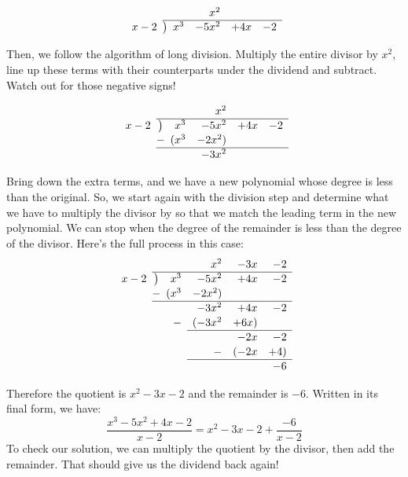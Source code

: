 \[
\renewcommand\arraystretch{1.1}
\begin{array}{*1r @{\hskip\arraycolsep}c@{\hskip\arraycolsep} *4r}
		&	~	&&x^2&\\
\cline{2-6}
x-2		&\big)	&x^3&-5x^2&+4x&-2\\
\end{array}
\]


Then, we follow the algorithm of long division. Multiply the entire divisor by $x^2$, line up these terms with their counterparts under the dividend and subtract. Watch out for those negative signs!

\[
\renewcommand\arraystretch{1.1}
\begin{array}{*1r @{\hskip\arraycolsep}c@{\hskip\arraycolsep} *4r}
		&	~	&&x^2&\\
\cline{2-6}
x-2		&\big)	&x^3&-5x^2&+4x&-2\\
		&-		&(x^3&-2x^2)\\
\cline{2-6}
		&		&~	&-3x^2\\
\end{array}
\]

Bring down the extra terms, and we have a new polynomial whose degree is less than the original. So, we start again with the division step and determine what we have to multiply the divisor by so that we match the leading term in the new polynomial. We can stop when the degree of the remainder is less than the degree of the divisor. Here's the full process in this case:
\[
\renewcommand\arraystretch{1.1}
\begin{array}{*1r @{\hskip\arraycolsep}c@{\hskip\arraycolsep} *4r}
		&	~	&&x^2&-3x&-2\\
\cline{2-6}
x-2		&\big)	&x^3&-5x^2&+4x&-2\\
		&-		&(x^3&-2x^2)\\
\cline{2-6}
		&		&~	&-3x^2&+4x&-2\\
		&		&-	&(-3x^2&+6x)&\\
\cline{4-6}
		&		&&	&-2x&-2\\
		&		&&-	&(-2x&+4)\\
\cline{4-6}
		&		&&		&&-6
\end{array}
\]

Therefore the quotient is $x^2-3x-2$ and the remainder is $-6$. Written in its final form, we have:
\[\frac{x^3-5x^2+4x-2}{x-2} = x^2-3x-2+\frac{-6}{x-2}\]
To check our solution, we can multiply the quotient by the divisor, then add the remainder. That should give us the dividend back again!


